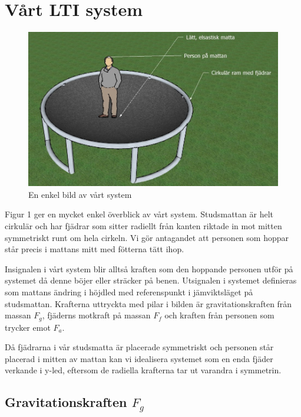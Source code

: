 \documentclass[10pt,a4paper]{article}
\begin{document}
\newpage
\section{Vårt LTI system}

\begin{figure}[ht]
\caption{En enkel bild av vårt system}
\includegraphics[scale=0.8]{Bild2}
\end{figure}
\clearpage

Figur 1 ger en mycket enkel överblick av vårt system. Studsmattan är helt cirkulär och har fjädrar som sitter radiellt från kanten riktade in mot mitten symmetriskt runt om hela cirkeln. Vi gör antagandet att personen som hoppar står precis i mattans mitt med fötterna tätt ihop.


Insignalen i vårt system blir alltså kraften som den hoppande personen utför på systemet då denne böjer eller sträcker på benen. Utsignalen i systemet definieras som mattans ändring i höjdled med referenspunkt i jämviktsläget på studsmattan.
Krafterna uttryckta med pilar i bilden är gravitationskraften från massan $F_g$, fjäderns motkraft på massan $F_f$ och kraften från personen som trycker emot $F_a$.

Då fjädrarna i vår studsmatta är placerade symmetriskt och personen står placerad i mitten av mattan kan vi idealisera systemet som en enda fjäder verkande i y-led, eftersom de radiella krafterna tar ut varandra i symmetrin.

\subsection{Gravitationskraften $F_g$}
\end{document}
